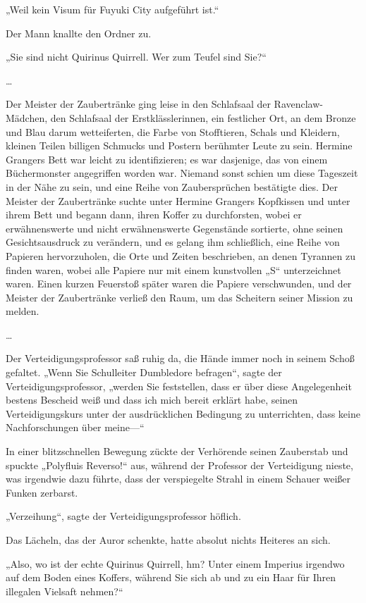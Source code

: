 {„Weil kein Visum für Fuyuki City aufgeführt ist.“

Der Mann knallte den Ordner zu.

„Sie sind nicht Quirinus Quirrell. Wer zum Teufel sind Sie?“

…

Der Meister der Zaubertränke ging leise in den Schlafsaal der Ravenclaw-Mädchen, den Schlafsaal der Erstklässlerinnen, ein festlicher Ort, an dem Bronze und Blau darum wetteiferten, die Farbe von Stofftieren, Schals und Kleidern, kleinen Teilen billigen Schmucks und Postern berühmter Leute zu sein. Hermine Grangers Bett war leicht zu identifizieren; es war dasjenige, das von einem Büchermonster angegriffen worden war. Niemand sonst schien um diese Tageszeit in der Nähe zu sein, und eine Reihe von Zaubersprüchen bestätigte dies. Der Meister der Zaubertränke suchte unter Hermine Grangers Kopfkissen und unter ihrem Bett und begann dann, ihren Koffer zu durchforsten, wobei er erwähnenswerte und nicht erwähnenswerte Gegenstände sortierte, ohne seinen Gesichtsausdruck zu verändern, und es gelang ihm schließlich, eine Reihe von Papieren hervorzuholen, die Orte und Zeiten beschrieben, an denen Tyrannen zu finden waren, wobei alle Papiere nur mit einem kunstvollen „S“ unterzeichnet waren. Einen kurzen Feuerstoß später waren die Papiere verschwunden, und der Meister der Zaubertränke verließ den Raum, um das Scheitern seiner Mission zu melden.

…

Der Verteidigungsprofessor saß ruhig da, die Hände immer noch in seinem Schoß gefaltet. „Wenn Sie Schulleiter Dumbledore befragen“, sagte der Verteidigungsprofessor, „werden Sie feststellen, dass er über diese Angelegenheit bestens Bescheid weiß und dass ich mich bereit erklärt habe, seinen Verteidigungskurs unter der ausdrücklichen Bedingung zu unterrichten, dass keine Nachforschungen über meine—“

In einer blitzschnellen Bewegung zückte der Verhörende seinen Zauberstab und spuckte „Polyfluis Reverso!“ aus, während der Professor der Verteidigung nieste, was irgendwie dazu führte, dass der verspiegelte Strahl in einem Schauer weißer Funken zerbarst.

„Verzeihung“, sagte der Verteidigungsprofessor höflich.

Das Lächeln, das der Auror schenkte, hatte absolut nichts Heiteres an sich.

„Also, wo ist der echte Quirinus Quirrell, hm? Unter einem Imperius irgendwo auf dem Boden eines Koffers, während Sie sich ab und zu ein Haar für Ihren illegalen Vielsaft nehmen?“

}
